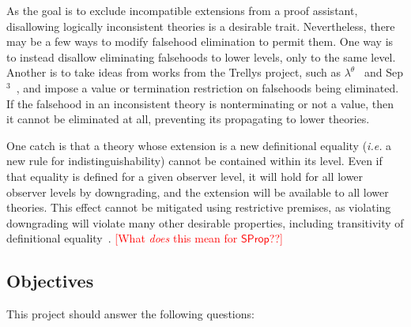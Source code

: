\documentclass{article}
\makeatletter
\newcommand{\note}[1]{\textcolor{red}{[#1]}}
\newcommand{\ie}{\textit{i.e.}\@\xspace}
\newcommand{\eg}{\textit{e.g.}\@\xspace}
\newcommand{\kw}[1]{\mathsf{#1}}
\makeatother
\begin{document}
As the goal is to exclude incompatible extensions from a proof assistant,
disallowing logically inconsistent theories is a desirable trait.
Nevertheless, there may be a few ways to modify falsehood elimination to permit them.
One way is to instead disallow eliminating falsehoods to lower levels,
only to the same level.
Another is to take ideas from works from the Trellys project,
such as $\lambda^\theta$~\citep{lambda-theta} and Sep$^3$~\citep{sep3},
and impose a value or termination restriction on falsehoods being eliminated.
If the falsehood in an inconsistent theory is nonterminating or not a value,
then it cannot be eliminated at all,
preventing its propagating to lower theories.

One catch is that a theory whose extension is a new definitional equality
(\ie a new rule for indistinguishability) cannot be contained within its level.
Even if that equality is defined for a given observer level,
it will hold for all lower observer levels by downgrading,
and the extension will be available to all lower theories.
This effect cannot be mitigated using restrictive premises,
as violating downgrading will violate many other desirable properties,
including transitivity of definitional equality~\citep{dcoi-omega}.
\note{What \emph{does} this mean for $\kw{SProp}$??}

\subsection{Objectives}

This project should answer the following questions:

\end{document}
